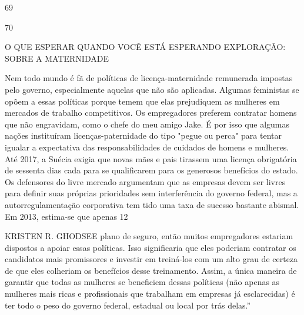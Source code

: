  \par 
69
 \par 
70
 \par 
O QUE ESPERAR QUANDO VOCÊ ESTÁ ESPERANDO EXPLORAÇÃO: SOBRE A MATERNIDADE
 \par 
Nem todo mundo é fã de políticas de licença-maternidade remunerada impostas pelo governo, especialmente aquelas que não são aplicadas. Algumas feministas se opõem a essas políticas porque temem que elas prejudiquem as mulheres em mercados de trabalho competitivos. Os empregadores preferem contratar homens que não engravidam, como o chefe do meu amigo Jake. É por isso que algumas nações instituíram licenças-paternidade do tipo "pegue ou perca" para tentar igualar a expectativa das responsabilidades de cuidados de homens e mulheres. Até 2017, a Suécia exigia que novas mães e pais tirassem uma licença obrigatória de sessenta dias cada para se qualificarem para os generosos benefícios do estado. Os defensores do livre mercado argumentam que as empresas devem ser livres para definir suas próprias prioridades sem interferência do governo federal, mas a autorregulamentação corporativa tem tido uma taxa de sucesso bastante abismal. Em 2013, estima-se que apenas 12%
 \par 
KRISTEN R. GHODSEE plano de seguro, então muitos empregadores estariam dispostos a apoiar essas políticas. Isso significaria que eles poderiam contratar os candidatos mais promissores e investir em treiná-los com um alto grau de certeza de que eles colheriam os benefícios desse treinamento. Assim, a única maneira de garantir que todas as mulheres se beneficiem dessas políticas (não apenas as mulheres mais ricas e profissionais que trabalham em empresas já esclarecidas) é ter todo o peso do governo federal, estadual ou local por trás delas.”
 \par 
